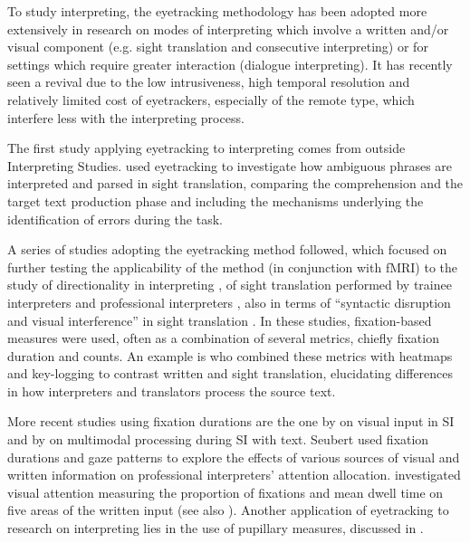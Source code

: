 To study interpreting, the eyetracking methodology has been adopted more extensively in research on modes of interpreting which involve a written and/or visual component (e.g. sight translation and consecutive interpreting) or for settings which require greater interaction (dialogue interpreting). It has recently seen a revival due to the low intrusiveness, high temporal resolution and relatively limited cost of eyetrackers, especially of the remote type, which interfere less with the interpreting process.

The first study applying eyetracking to interpreting comes from outside Interpreting Studies. \citet{mcdonald_simultaneous_1981} used eyetracking to investigate how ambiguous phrases are interpreted and parsed in sight translation, comparing the comprehension and the target text production phase and including the mechanisms underlying the identification of errors during the task.

A series of studies adopting the eyetracking method followed, which focused on further testing the applicability of the method (in conjunction with fMRI) to the study of directionality in interpreting \citep{chang_testing_2009}, of sight translation performed by trainee interpreters \citep{way_eye_2013} and professional interpreters \citep{dragsted_speaking_2007}, also in terms of ``syntactic disruption and visual interference'' in sight translation \citep{shreve_cognitive_2010}. In these studies, fixation-based measures were used, often as a combination of several metrics, chiefly fixation duration and counts. An example is \citet{dragsted_exploring_2009} who combined these metrics with heatmaps and key-logging to contrast written and sight translation, elucidating differences in how interpreters and translators process the source text.

More recent studies using fixation durations are the one by \citet{seubert_visuelle_2019} on visual input in SI and by \citet{seeber_when_2020} on multimodal processing during SI with text. Seubert used fixation durations and gaze patterns to explore the effects of various sources of visual and written information on professional interpreters' attention allocation. \citet{seeber_when_2020} investigated visual attention measuring the proportion of fixations and mean dwell time on five areas of the written input (see also ). Another application of eyetracking to research on interpreting lies in the use of pupillary measures, discussed in .

